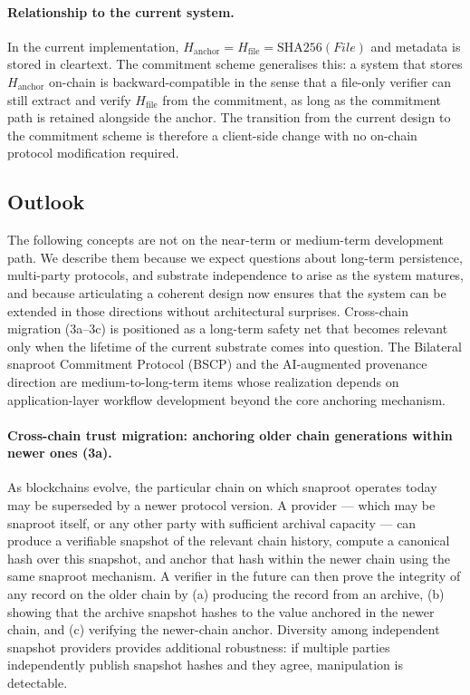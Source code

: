 \documentclass[11pt,a4paper]{article}
\begin{document}
\paragraph{Relationship to the current system.}
In the current implementation, $H_{\mathrm{anchor}} =
H_{\mathrm{file}} = \mathrm{SHA256}(\mathit{File})$ and metadata is
stored in cleartext. The commitment scheme generalises this: a system
that stores $H_{\mathrm{anchor}}$ on-chain is backward-compatible in
the sense that a file-only verifier can still extract and verify
$H_{\mathrm{file}}$ from the commitment, as long as the commitment
path is retained alongside the anchor. The transition from the current
design to the commitment scheme is therefore a client-side change with
no on-chain protocol modification required.

\subsection{Outlook}
\label{sec:limitations:outlook}

The following concepts are not on the near-term or medium-term
development path. We describe them because we expect questions about
long-term persistence, multi-party protocols, and substrate
independence to arise as the system matures, and because articulating
a coherent design now ensures that the system can be extended in those
directions without architectural surprises. Cross-chain migration
(3a--3c) is positioned as a long-term safety net that becomes
relevant only when the lifetime of the current substrate comes into
question. The Bilateral snaproot Commitment Protocol (BSCP) and the
AI-augmented provenance direction are medium-to-long-term items whose
realization depends on application-layer workflow development beyond
the core anchoring mechanism.

\paragraph{Cross-chain trust migration: anchoring older chain
generations within newer ones (3a).} As blockchains evolve, the
particular chain on which snaproot operates today may be superseded by
a newer protocol version. A provider --- which may be snaproot itself,
or any other party with sufficient archival capacity --- can produce a
verifiable snapshot of the relevant chain history, compute a canonical
hash over this snapshot, and anchor that hash within the newer chain
using the same snaproot mechanism. A verifier in the future can then
prove the integrity of any record on the older chain by (a) producing
the record from an archive, (b) showing that the archive snapshot
hashes to the value anchored in the newer chain, and (c) verifying the
newer-chain anchor. Diversity among independent snapshot providers
provides additional robustness: if multiple parties independently
publish snapshot hashes and they agree, manipulation is detectable.
\end{document}
